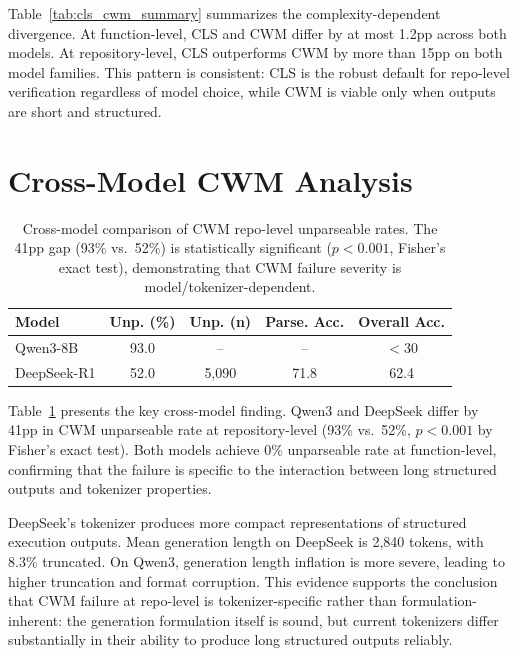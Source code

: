 \documentclass[11pt]{article}
\begin{document}
Table~\ref{tab:cls_cwm_summary} summarizes the complexity-dependent divergence. At function-level, CLS and CWM differ by at most 1.2pp across both models. At repository-level, CLS outperforms CWM by more than 15pp on both model families. This pattern is consistent: CLS is the robust default for repo-level verification regardless of model choice, while CWM is viable only when outputs are short and structured.

\section{Cross-Model CWM Analysis}
\label{sec:cross_model}

\begin{table}[t]
\centering
\small
\begin{tabular}{lcccc}
\toprule
\textbf{Model} & \textbf{Unp. (\%)} & \textbf{Unp. (n)} & \textbf{Parse. Acc.} & \textbf{Overall Acc.} \\
\midrule
Qwen3-8B     & 93.0 & --   & --   & $<$30 \\
DeepSeek-R1   & 52.0 & 5,090 & 71.8 & 62.4 \\
\bottomrule
\end{tabular}
\caption{Cross-model comparison of CWM repo-level unparseable rates. The 41pp gap (93\% vs.\ 52\%) is statistically significant ($p{<}0.001$, Fisher's exact test), demonstrating that CWM failure severity is model/tokenizer-dependent.}
\label{tab:cross_cwm}
\end{table}

Table~\ref{tab:cross_cwm} presents the key cross-model finding. Qwen3 and DeepSeek differ by 41pp in CWM unparseable rate at repository-level (93\% vs.\ 52\%, $p{<}0.001$ by Fisher's exact test). Both models achieve 0\% unparseable rate at function-level, confirming that the failure is specific to the interaction between long structured outputs and tokenizer properties.

DeepSeek's tokenizer produces more compact representations of structured execution outputs. Mean generation length on DeepSeek is 2,840 tokens, with 8.3\% truncated. On Qwen3, generation length inflation is more severe, leading to higher truncation and format corruption. This evidence supports the conclusion that CWM failure at repo-level is tokenizer-specific rather than formulation-inherent: the generation formulation itself is sound, but current tokenizers differ substantially in their ability to produce long structured outputs reliably.
\end{document}
